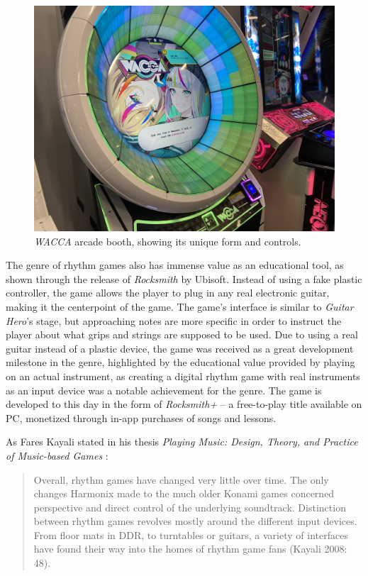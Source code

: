 \begin{figure}[h]
    \centering\includegraphics[scale=0.01]{obrazki/waccaarcade.jpg}
    \caption{\textit{WACCA} arcade booth, showing its unique form and controls. \cite{waccaarcade}}
    \label{fig:wacca_arcade}
\end{figure}

The genre of rhythm games also has immense value as an educational tool, as shown through the release of \textit{Rocksmith} by Ubisoft. Instead of using a fake plastic controller, the game allows the player to plug in any real electronic guitar, making it the centerpoint of the game. The game's interface is similar to \textit{Guitar Hero}'s stage, but approaching notes are more specific in order to instruct the player about what grips and strings are supposed to be used. Due to using a real guitar instead of a plastic device, the game was received as a great development milestone in the genre, highlighted by the educational value provided by playing on an actual instrument, as creating a digital rhythm game with real instruments as an input device was a notable achievement for the genre. The game is developed to this day in the form of \textit{Rocksmith+} -- a free-to-play title available on PC, monetized through in-app purchases of songs and lessons.

As Fares Kayali stated in his thesis \textit{Playing Music: Design, Theory, and Practice of Music-based Games} \cite{faresplayingmusic}: 
\begin{quote}
    Overall, rhythm games have changed very little over time. The only changes Harmonix made to the much older Konami games concerned perspective and direct control of the underlying soundtrack. Distinction between rhythm games revolves mostly around the different input devices. From floor mats in DDR, to turntables or guitars, a variety of interfaces have found their way into the homes of rhythm game fans (Kayali 2008: 48).
\end{quote}

